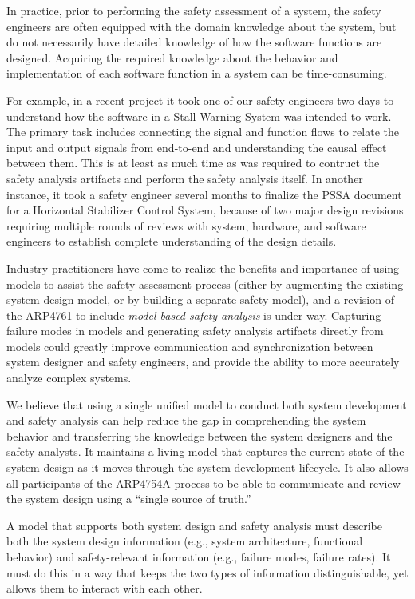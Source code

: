 In practice, prior to performing the safety assessment of a system, the safety engineers are often equipped with the domain knowledge about the system, but do not necessarily have detailed knowledge of how the software functions are designed. Acquiring the required knowledge about the behavior and implementation of each software function in a system can be time-consuming.

For example, in a recent project it took one of our safety engineers two days to understand how the software in a Stall Warning System was intended to work. The primary task includes connecting the signal and function flows to relate the input and output signals from end-to-end and understanding the causal effect between them. This is at least as much time as was required to contruct the safety analysis artifacts and perform the safety analysis itself. In another instance, it took a safety engineer several months to finalize the PSSA document for a Horizontal Stabilizer Control System, because of two major design revisions requiring multiple rounds of reviews with system, hardware, and software engineers to establish complete understanding of the design %
details.

Industry practitioners have come to realize the benefits and importance of
using models to assist the safety assessment process (either by augmenting the existing system design model, or by building a separate safety model), and a revision of the ARP4761 to include {\em model based safety analysis} is under way.
Capturing failure modes in models and generating safety analysis artifacts directly from models could greatly improve communication and synchronization between system designer and safety engineers, and provide the ability to more accurately analyze complex systems. 

We believe that using a single unified model to conduct both system development and safety analysis can help reduce the gap in comprehending the system behavior and transferring the knowledge between the system designers and the safety analysts. It maintains a living model that captures the current state of the system design as it moves through the system development lifecycle.
It also allows all participants of the ARP4754A process to be able to communicate and review the system design using a ``single source of truth.''

A model that supports both system design and safety analysis must describe both the system design information (e.g., system architecture, functional behavior) and safety-relevant information (e.g., failure modes, failure rates).  It must do this in a way that keeps the two types of information distinguishable, yet allows them to interact with each other.

